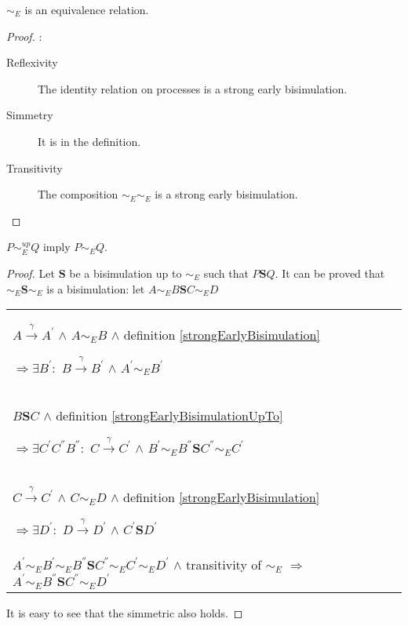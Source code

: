  

\begin{proposition}
  $\sim_{E}$ is an equivalence relation.
  \begin{proof}:
    \begin{description}
      \item[Reflexivity]
	The identity relation on processes is a strong early bisimulation.
      \item[Simmetry]
	It is in the definition.
      \item[Transitivity]
	The composition $\sim_{E} \sim_{E}$ is a strong early bisimulation.
    \end{description}
  \end{proof}
\end{proposition}

\begin{proposition}\label{earlyBisimilarityUpToImplyEarlyBisimilarity}
  $P \sim_{E}^{up} Q$ imply $P \sim_{E} Q$.
  \begin{proof}
    Let $\mathbf{S}$ be a bisimulation up to $\sim_{E}$ such that $P \mathbf{S} Q$. It can be proved that $\sim_{E} \mathbf{S} \sim_{E}$ is a bisimulation: let $A \sim_{E} B \mathbf{S} C \sim_{E} D$
    \begin{center}
      \begin{tabular}{l}
	$A \xrightarrow{\gamma} A^{'}$ $\wedge$ $A \sim_{E} B$ $\wedge$ definition \ref{strongEarlyBisimulation} 
      
	$\Rightarrow \exists B^{'}:$ $B \xrightarrow{\gamma} B^{'}$ $\wedge$ $A^{'}\sim_{E} B^{'}$
      \\
	$B \mathbf{S} C$ $\wedge$ definition \ref{strongEarlyBisimulationUpTo}
      
	$\Rightarrow \exists C^{'} C^{''} B^{''}:$ $C \xrightarrow{\gamma} C^{'}$ $\wedge$ $B^{'} \sim_{E} B^{''} \mathbf{S} C^{''} \sim_{E} C^{'}$
      \\
	$C \xrightarrow{\gamma} C^{'}$ $\wedge$ $C \sim_{E} D$ $\wedge$ definition \ref{strongEarlyBisimulation} 
      
	$\Rightarrow \exists D^{'}:$ $D \xrightarrow{\gamma} D^{'}$ $\wedge$ $C^{'}\mathbf{S} D^{'}$
      \\
	$A^{'} \sim_{E} B^{'} \sim_{E} B^{''} \mathbf{S} C^{''} \sim_{E} C^{'} \sim_{E} D^{'}$ $\wedge$ transitivity of $\sim_{E}$
	$\Rightarrow$ $A^{'} \sim_{E} B^{''} \mathbf{S} C^{''} \sim_{E} D^{'}$
      \end{tabular}
    \end{center}
    It is easy to see that the simmetric also holds.
  \end{proof}
\end{proposition}


